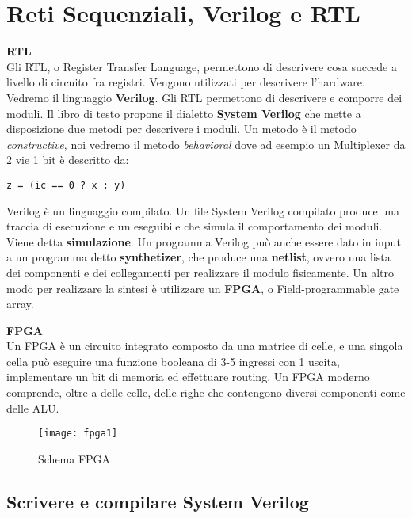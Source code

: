 \chapter{Reti Sequenziali, Verilog e RTL}

\begin{defn}
	\textbf{RTL} \\

	Gli RTL, o Register Transfer Language, permettono di descrivere cosa succede
	a livello di circuito fra registri. Vengono utilizzati per descrivere
	l'hardware. Vedremo il linguaggio \textbf{Verilog}. Gli RTL permettono di
	descrivere e comporre dei moduli. Il libro di testo propone il dialetto
	\textbf{System Verilog} che mette a disposizione due metodi per descrivere i
	moduli. Un metodo è il metodo \textit{constructive}, noi vedremo il metodo
	\textit{behavioral} dove ad esempio un Multiplexer da 2 vie 1 bit è
	descritto da:
	\begin{lstlisting}[style={verilog}]
		z = (ic == 0 ? x : y)
	\end{lstlisting}
	
	Verilog è un linguaggio compilato. Un file System Verilog compilato produce
	una traccia di esecuzione e un eseguibile che simula il comportamento dei
	moduli. Viene detta \textbf{simulazione}. Un programma Verilog può anche
	essere dato in input a un programma detto \textbf{synthetizer}, che produce
	una \textbf{netlist}, ovvero una lista dei componenti e dei collegamenti per
	realizzare il modulo fisicamente. Un altro modo per realizzare la sintesi è
	utilizzare un \textbf{FPGA}, o Field-programmable gate array.
\end{defn}

\begin{defn}
	\textbf{FPGA} \\

	Un FPGA è un circuito integrato composto da una matrice di celle, e una
	singola cella può eseguire una funzione booleana di 3-5 ingressi con 1
	uscita, implementare un bit di memoria ed effettuare routing. Un FPGA
	moderno comprende, oltre a delle celle, delle righe che contengono diversi
	componenti come delle ALU.
\end{defn}



\begin{figure}[H]
	\centering
	\texttt{[image: fpga1]}
	\caption{Schema FPGA}
\end{figure}

\section{Scrivere e compilare System Verilog}

